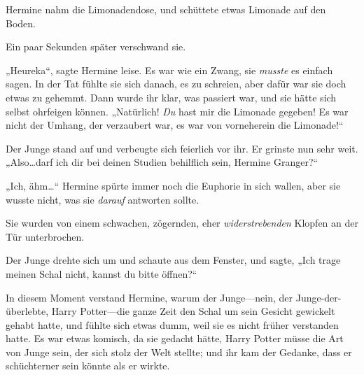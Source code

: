 Hermine nahm die Limonadendose, und schüttete etwas Limonade auf den Boden.

Ein paar Sekunden später verschwand sie.

„Heureka“, sagte Hermine leise. Es war wie ein Zwang, sie \emph{musste} es einfach sagen. In der Tat fühlte sie sich danach, es zu schreien, aber dafür war sie doch etwas zu gehemmt. Dann wurde ihr klar, was passiert war, und sie hätte sich selbst ohrfeigen können. „Natürlich! \emph{Du} hast mir die Limonade gegeben! Es war nicht der Umhang, der verzaubert war, es war von vorneherein die Limonade!“

Der Junge stand auf und verbeugte sich feierlich vor ihr. Er grinste nun sehr weit. „Also…darf ich dir bei deinen Studien behilflich sein, Hermine Granger?“

„Ich, ähm…“ Hermine spürte immer noch die Euphorie in sich wallen, aber sie wusste nicht, was sie \emph{darauf} antworten sollte.

Sie wurden von einem schwachen, zögernden, eher \emph{widerstrebenden} Klopfen an der Tür unterbrochen.

Der Junge drehte sich um und schaute aus dem Fenster, und sagte, „Ich trage meinen Schal nicht, kannst du bitte öffnen?“

In diesem Moment verstand Hermine, warum der Junge—nein, der Junge-der-überlebte, Harry Potter—die ganze Zeit den Schal um sein Gesicht gewickelt gehabt hatte, und fühlte sich etwas dumm, weil sie es nicht früher verstanden hatte. Es war etwas komisch, da sie gedacht hätte, Harry Potter müsse die Art von Junge sein, der sich stolz der Welt stellte; und ihr kam der Gedanke, dass er schüchterner sein könnte als er wirkte.

